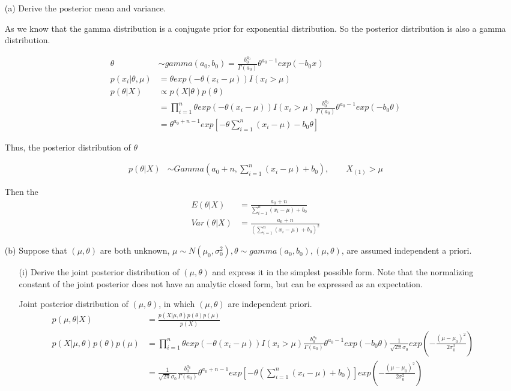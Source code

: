 \documentclass[11pt]{article} %
\begin{document}
\begin{itemize}
	\item[(a)]  Derive the posterior mean and variance.

	As we know that the gamma distribution is a conjugate prior for exponential distribution. So the posterior distribution is also a gamma distribution.
	
	\begin{align*}
		\theta & \sim gamma(a_0, b_0) = \frac{b_0^{a_0}}{\Gamma(a_0)} \theta^{a_0-1} exp(-b_0 x) \\
		p(x_i|\theta, \mu) &= \theta exp(-\theta (x_i-\mu)) I(x_i> \mu) \\
		p(\theta|X) & \propto p(X|\theta) p(\theta) \\
		&= \prod_{i=1}^n \theta exp(-\theta (x_i-\mu)) I(x_i> \mu) \frac{b_0^{a_0}}{\Gamma(a_0)} \theta^{a_0-1} exp(-b_0 \theta) \\
		&= \theta^{a_0 + n-1} exp[ -\theta \sum_{i=1}^n (x_i-\mu) - b_0 \theta]
	\end{align*}

Thus, the posterior distribution of $\theta$

\begin{align*}
	p(\theta|X) & \sim Gamma(a_0 + n, \sum_{i=1}^n (x_i-\mu) + b_0) , \qquad X_{(1)} > \mu
\end{align*}
	
Then the 
\begin{align*}
	E(\theta|X) & = \frac{a_0 + n}{\sum_{i=1}^n (x_i-\mu) + b_0} \\
	Var(\theta|X) &= \frac{a_0 + n}{(\sum_{i=1}^n (x_i-\mu) + b_0)^2} 
\end{align*}


\item[(b)] Suppose that $(\mu, \theta)$ are both unknown, $\mu \sim N(\mu_0, \sigma_0^2), \theta \sim gamma(a_0, b_0), (\mu, \theta)$, are assumed independent a priori.

\begin{itemize}
	\item [(i)] Derive the joint posterior distribution of $(\mu, \theta)$  and express it in the simplest possible form. Note that the normalizing constant of the joint posterior does not have an analytic closed form, but can be expressed as an expectation.
	
	Joint posterior distribution of $(\mu, \theta)$, in which $(\mu, \theta)$ are independent priori.
\begin{align*}
	p(\mu, \theta|X) & = \frac{p(X|\mu, \theta) p(\theta) p(\mu)}{p(X)} \\
	p(X|\mu, \theta) p(\theta) p(\mu) &= \prod_{i=1}^n \theta exp(-\theta (x_i-\mu)) I(x_i> \mu) \frac{b_0^{a_0}}{\Gamma(a_0)} \theta^{a_0-1} exp(-b_0 \theta) \frac{1}{\sqrt{2\pi} \sigma_0} exp(-\frac{(\mu-\mu_0)^2}{2 \sigma_0^2})\\
	&= \frac{1}{\sqrt{2\pi} \sigma_0} \frac{b_0^{a_0}}{\Gamma(a_0)} \theta^{a_0+n-1} exp[-\theta (\sum_{i=1}^n (x_i-\mu)  + b_0)]   exp(-\frac{(\mu-\mu_0)^2}{2 \sigma_0^2})\\
\end{align*}


\end{itemize}
\end{itemize}
\end{document}

